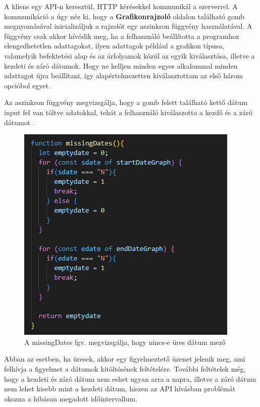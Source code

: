 \pagebreak

A kliens egy API-n keresztül, HTTP kérésekkel kommunikál a szerverrel. A kommunikáció a úgy néz ki, hogy a \textbf{Grafikonrajzoló} oldalon található gomb megnyomásával inicializáljuk a rajzolót egy aszinkron függvény használatával. A függvény csak akkor hívódik meg, ha a felhasználó beállította a programhoz elengedhetetlen adattagokat, ilyen adattagok például a grafikon típusa, valamelyik befektetési alap és az árfolyamok közül az egyik kiválasztása, illetve a kezdeti és záró dátumok. Hogy ne kelljen minden egyes alkalommal minden adattagot újra beállítani, így alapértelmezetten kiválasztottam az első három opcióbol egyet.
	
	Az aszinkron függvény megvizsgálja, hogy a gomb felett található kettő dátum input fel van töltve adatokkal, tehát a felhasználó kiválaszotta a kezdő és a záró dátumot . 

\begin{figure}[h]
\centering
\includegraphics[scale=0.8]{images/dateValidation.png}
\caption{A missingDates fgv. megvizsgálja, hogy nincs-e üres dátum mező}
\label{fig:validation}
\end{figure}

Abban az esetben, ha üresek, akkor egy figyelmeztető üzenet jelenik meg, ami felhívja a figyelmet a dátumok kitöltésének feltételére. További feltételek még, hogy a kezdeti és záró dátum nem eshet ugyan arra a napra, illetve a záró dátum nem lehet kisebb mint a kezdeti dátum, hiszen az API hívásban problémát okozna a hibásan megadott időintervallum.

